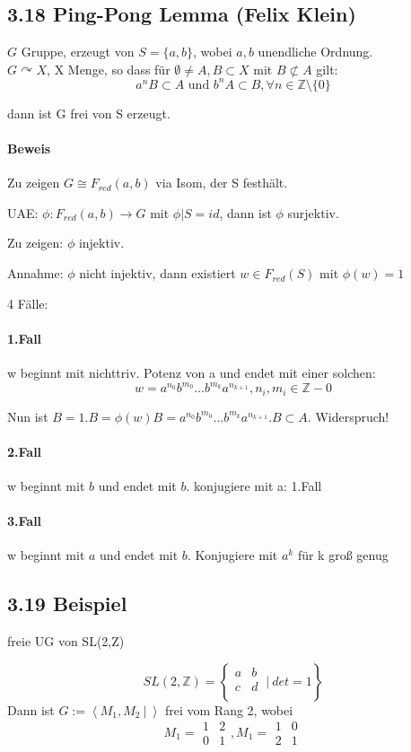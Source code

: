\documentclass{article}
\newcommand{\Z}{\mathbb{Z}}
\newcommand{\set}[2]{\left\lbrace #1~|~#2 \right\rbrace}
\newcommand{\grp}[2]{\left\langle #1~|~#2 \right\rangle}
\begin{document}
\subsection{3.18 Ping-Pong Lemma (Felix Klein)}
$G$ Gruppe, erzeugt von $S = \{a,b\}$, wobei $a,b$ unendliche Ordnung.\\
$G \curvearrowright X$, X Menge, so dass für $\emptyset \neq A, B \subset X$
mit $B \not \subset A$ gilt:
\[a^nB \subset A \text{ und } b^nA \subset B, \forall n \in \Z\setminus\{0\} \]

dann ist G frei von S erzeugt.

\paragraph{Beweis}
Zu zeigen $G \cong F_{red}(a,b)$ via Isom, der S festhält.

UAE:
$\phi : F_{red}(a,b) \longrightarrow G$ mit $\phi|S = id$, dann ist $\phi$ surjektiv.

Zu zeigen: $\phi$ injektiv.

Annahme: $\phi$ nicht injektiv, dann existiert $w\in F_{red}(S)$ mit $\phi(w) = 1$

4 Fälle: 

\paragraph{1.Fall}
w beginnt mit nichttriv. Potenz von a und endet mit einer solchen:
\[w = a^{n_0}b^{m_0}...b^{m_k}a^{n_{k+1}}, n_i, m_i \in \Z- 0 \]

Nun ist $B = 1.B = \phi(w)B = a^{n_0}b^{m_0}...b^{m_k}a^{n_{k+1}}.B \subset A$. Widerspruch!

\paragraph{2.Fall}
w beginnt mit $b$ und endet mit $b$. konjugiere mit a: 1.Fall

\paragraph{3.Fall}
w beginnt mit $a$ und endet mit $b$. Konjugiere mit $a^k$ für k groß genug


\subsection{3.19 Beispiel}
freie UG von SL(2,Z)

\[SL(2,\Z) = \set{\begin{matrix}
	a & b\\
	c & d\\
	\end{matrix}}{det = 1}\]
Dann ist $G:= \grp{M_1, M_2}{}$ frei vom Rang 2, wobei 
\[M_1 =\begin{matrix}
1 & 2\\
0 & 1
\end{matrix}, M_1 =\begin{matrix}
1 & 0\\
2 & 1
\end{matrix}\]
\end{document}
